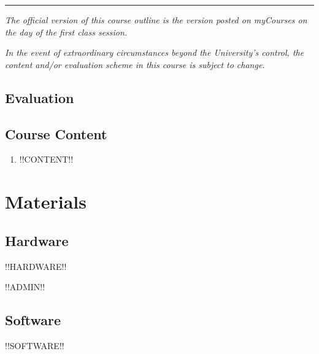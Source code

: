 \documentclass{article}
\begin{document}
\hrule
 
{\em The official version of this course outline is the version posted
  on myCourses on the day of the first class session.}

{\em In the event of extraordinary circumstances beyond the
  University's control, the content and/or evaluation scheme in this
  course is subject to change.}


\newpage

\subsection{Evaluation}
\label{eval}

\begin{center}
  \renewcommand{\arraystretch}{1.2}
\end{center}

\newpage

\subsection{Course Content}

\begin{enumerate}
\item{!!CONTENT!!}
\end{enumerate}

\newpage

\section{Materials}


\subsection{Hardware}

!!HARDWARE!!

!!ADMIN!!

\subsection{Software}

!!SOFTWARE!!
\end{document}

